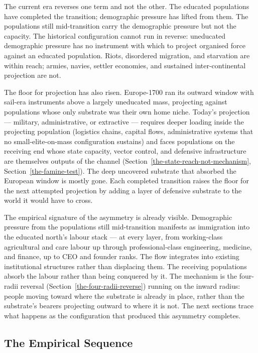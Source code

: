 \documentclass[12pt,letterpaper]{article}
\begin{document}
The current era reverses one term and not the other. The educated
populations have completed the transition; demographic pressure has
lifted from them. The populations still mid-transition carry the
demographic pressure but not the capacity. The historical
configuration cannot run in reverse: uneducated demographic pressure
has no instrument with which to project organised force against an
educated population. Riots, disordered migration, and starvation are
within reach; armies, navies, settler economies, and sustained
inter-continental projection are not.

The floor for projection has also risen. Europe-1700 ran its outward
window with sail-era instruments above a largely uneducated mass,
projecting against populations whose only substrate was their own
home niche. Today's projection --- military, administrative, or
extractive --- requires deeper loading inside the projecting
population (logistics chains, capital flows, administrative systems
that no small-elite-on-mass configuration sustains) and faces
populations on the receiving end whose state capacity, vector
control, and defensive infrastructure are themselves outputs of the
channel (Section~\ref{the-state-reach-not-mechanism},
Section~\ref{the-famine-test}). The deep uncovered substrate that
absorbed the European window is mostly gone. Each completed
transition raises the floor for the next attempted projection by
adding a layer of defensive substrate to the world it would have to
cross.

The empirical signature of the asymmetry is already visible.
Demographic pressure from the populations still mid-transition
manifests as immigration into the educated north's labour stack ---
at every layer, from working-class agricultural and care labour up
through professional-class engineering, medicine, and finance, up to
CEO and founder ranks. The flow integrates into existing institutional
structures rather than displacing them. The receiving populations
absorb the labour rather than being conquered by it. The mechanism is
the four-radii reversal (Section~\ref{the-four-radii-reverse}) running
on the inward radius: people moving toward where the substrate is
already in place, rather than the substrate's bearers projecting
outward to where it is not. The next sections trace what happens as
the configuration that produced this asymmetry completes.

\subsection{The Empirical Sequence}\label{the-empirical-sequence}
\end{document}
